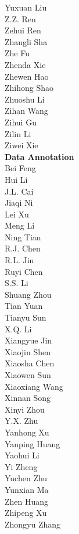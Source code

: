 \documentclass[11pt, a4paper, logo, copyright, nonumbering]{deepseek}
\begin{document}
\begin{CJK*}{UTF8}{gbsn}
\begin{multicols}{2}
Yuxuan Liu \\
Z.Z. Ren \\
Zehui Ren \\
Zhangli Sha \\
Zhe Fu \\
Zhenda Xie \\
Zhewen Hao \\
Zhihong Shao \\
Zhuoshu Li \\
Zihan Wang \\
Zihui Gu \\
Zilin Li \\
Ziwei Xie \\

\noindent
\textbf{Data Annotation} \\
Bei Feng  \\
Hui Li  \\
J.L. Cai  \\
Jiaqi Ni  \\
Lei Xu  \\
Meng Li  \\
Ning Tian  \\
R.J. Chen  \\
R.L. Jin  \\
Ruyi Chen  \\
S.S. Li  \\
Shuang Zhou  \\
Tian Yuan  \\
Tianyu Sun  \\
X.Q. Li  \\
Xiangyue Jin  \\
Xiaojin Shen  \\
Xiaosha Chen  \\
Xiaowen Sun  \\
Xiaoxiang Wang  \\
Xinnan Song  \\
Xinyi Zhou  \\
Y.X. Zhu  \\
Yanhong Xu  \\
Yanping Huang  \\
Yaohui Li  \\
Yi Zheng  \\
Yuchen Zhu  \\
Yunxian Ma  \\
Zhen Huang  \\
Zhipeng Xu  \\
Zhongyu Zhang  \\


\end{multicols}
\end{CJK*}
\end{document}
